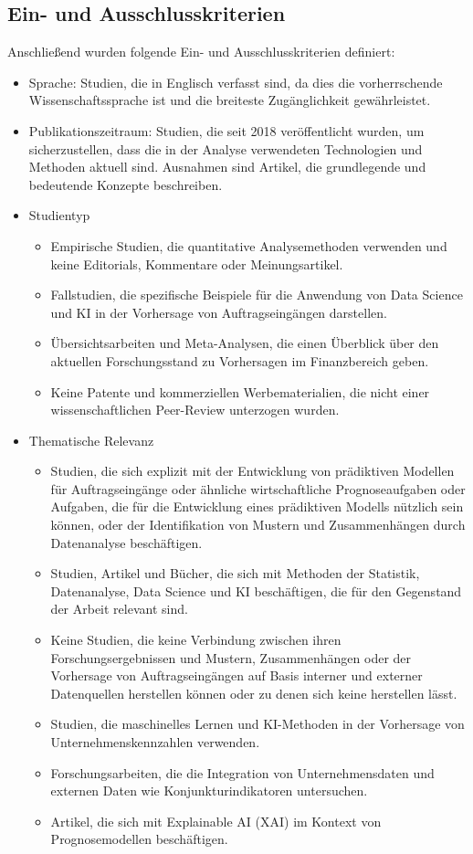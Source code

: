 \documentclass[lettersize,journal]{IEEEtran}
\begin{document}
\subsection{Ein- und Ausschlusskriterien}
Anschließend wurden folgende Ein- und Ausschlusskriterien definiert:

\begin{itemize}
  \item Sprache: Studien, die in Englisch verfasst sind, da dies die vorherrschende Wissenschaftssprache ist und die breiteste Zugänglichkeit gewährleistet.
  \item Publikationszeitraum: Studien, die seit 2018 veröffentlicht wurden, um sicherzustellen, dass die in der Analyse verwendeten Technologien und Methoden aktuell sind. Ausnahmen sind Artikel, die grundlegende und bedeutende Konzepte beschreiben.
  \item Studientyp
  \begin{itemize}
    \item Empirische Studien, die quantitative Analysemethoden verwenden und keine Editorials, Kommentare oder Meinungsartikel.
    \item Fallstudien, die spezifische Beispiele für die Anwendung von Data Science und KI in der Vorhersage von Auftragseingängen darstellen.
		\item Übersichtsarbeiten und Meta-Analysen, die einen Überblick über den aktuellen Forschungsstand zu Vorhersagen im Finanzbereich geben.
		\item Keine Patente und kommerziellen Werbematerialien, die nicht einer wissenschaftlichen Peer-Review unterzogen wurden.
  \end{itemize}
  \item Thematische Relevanz
  \begin{itemize}
    \item Studien, die sich explizit mit der Entwicklung von prädiktiven Modellen für Auftragseingänge oder ähnliche wirtschaftliche Prognoseaufgaben oder Aufgaben, die für die Entwicklung eines prädiktiven Modells nützlich sein können, oder der Identifikation von Mustern und Zusammenhängen durch Datenanalyse beschäftigen.
    \item Studien, Artikel und Bücher, die sich mit Methoden der Statistik, Datenanalyse, Data Science und KI beschäftigen, die für den Gegenstand der Arbeit relevant sind.
    \item Keine Studien, die keine Verbindung zwischen ihren Forschungsergebnissen und Mustern, Zusammenhängen oder der Vorhersage von Auftragseingängen auf Basis interner und externer Datenquellen herstellen können oder zu denen sich keine herstellen lässt.
		\item Studien, die maschinelles Lernen und KI-Methoden in der Vorhersage von Unternehmenskennzahlen verwenden.
		\item Forschungsarbeiten, die die Integration von Unternehmensdaten und externen Daten wie Konjunkturindikatoren untersuchen.
		\item Artikel, die sich mit Explainable AI (XAI) im Kontext von Prognosemodellen beschäftigen.
  \end{itemize}
\end{itemize}
\end{document}
